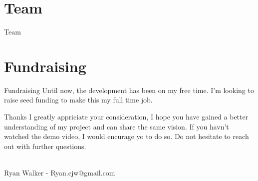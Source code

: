 \documentclass[final, ngerman, xcolor=pdftex, dvipsnames, table, aspectratio=169, 14pt]{beamer}
\begin{document}
\section{Team}
\begin{frame}{Team}
\end{frame}

\section{Fundraising}
\begin{frame}{Fundraising}
Until now, the development has been on my free time. I'm looking to raise seed funding to make this my full time job.
\end{frame}

\begin{frame}{Thanks}
I greatly appriciate your consideration, I hope you have gained a better understanding of my project and can share the same vision. If you havn't watched the demo video, I would encurage yo to do so. Do not hesitate to reach out with further questions.
\\~\\
\begin{center}
Ryan Walker - Ryan.cjw@gmail.com
\end{center}
\end{frame}
\end{document}
